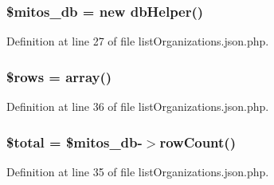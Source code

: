 \hypertarget{list_organizations_8json_8php_ab5d961f93efe4e2e8d8374f01dd6c65a}{
\subsubsection[{\$mitos\-\_\-db}]{\setlength{\rightskip}{0pt plus 5cm}\$mitos\-\_\-db = new {\bf db\-Helper}()}}\label{list_organizations_8json_8php_ab5d961f93efe4e2e8d8374f01dd6c65a}


\-Definition at line 27 of file list\-Organizations.\-json.\-php.

\hypertarget{list_organizations_8json_8php_ace2ec39e7df3899fa8df9640ec274b03}{
\subsubsection[{\$rows}]{\setlength{\rightskip}{0pt plus 5cm}\$rows = array()}}\label{list_organizations_8json_8php_ace2ec39e7df3899fa8df9640ec274b03}


\-Definition at line 36 of file list\-Organizations.\-json.\-php.

\hypertarget{list_organizations_8json_8php_a241b818f48030b628685b2e5119c5624}{
\subsubsection[{\$total}]{\setlength{\rightskip}{0pt plus 5cm}\$total = \$mitos\-\_\-db-\/$>$row\-Count()}}\label{list_organizations_8json_8php_a241b818f48030b628685b2e5119c5624}


\-Definition at line 35 of file list\-Organizations.\-json.\-php.

